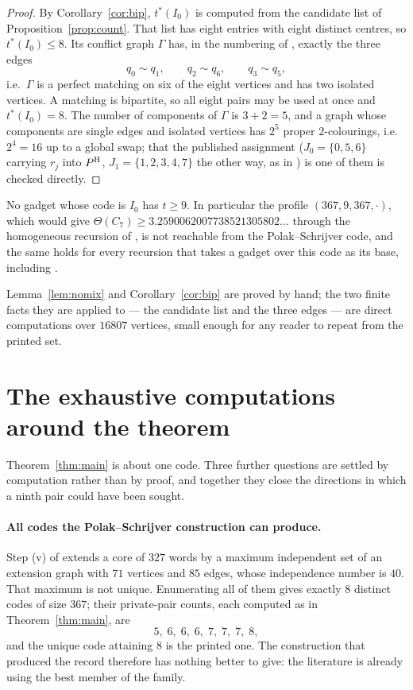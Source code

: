 \begin{proof}
By Corollary~\ref{cor:bip}, $t^*(I_0)$ is computed from the candidate list of
Proposition~\ref{prop:count}. That list has eight entries with eight distinct centres, so
$t^*(I_0)\le 8$. Its conflict graph $\Gamma$ has, in the numbering of \cite{gao2026},
exactly the three edges
\[
  q_0\sim q_1,\qquad q_2\sim q_6,\qquad q_3\sim q_5,
\]
i.e.\ $\Gamma$ is a perfect matching on six of the eight vertices and has two isolated
vertices. A matching is bipartite, so all eight pairs may be used at once and
$t^*(I_0)=8$. The number of components of $\Gamma$ is $3+2=5$, and a graph whose components
are single edges and isolated vertices has $2^5$ proper $2$-colourings, i.e.\ $2^4=16$ up to
a global swap; that the published assignment ($J_0=\{0,5,6\}$ carrying $r_j$ into $P^{\mathrm H}$,
$J_1=\{1,2,3,4,7\}$ the other way, as in \cite{gao2026}) is one of them is checked directly.
\end{proof}

\begin{corollary}
No gadget whose code is $I_0$ has $t\ge 9$. In particular the profile $(367,9,367,\cdot)$,
which would give $\Theta(C_7)\ge 3.2590062007738521305802\ldots$ through the homogeneous
recursion of \cite{gao2026,bpz2026}, is not reachable from the Polak--Schrijver code, and the
same holds for every recursion that takes a gadget over this code as its base, including
\cite{tandon2026}.
\end{corollary}

Lemma~\ref{lem:nomix} and Corollary~\ref{cor:bip} are proved by hand; the two finite facts
they are applied to --- the candidate list and the three edges --- are direct computations over
$16807$ vertices, small enough for any reader to repeat from the printed set.

\section{The exhaustive computations around the theorem}
\label{sec:exhaustive}

Theorem~\ref{thm:main} is about one code. Three further questions are settled by computation
rather than by proof, and together they close the directions in which a ninth pair could have
been sought.

\paragraph{All codes the Polak--Schrijver construction can produce.}
Step (v) of \cite{polak2019} extends a core of $327$ words by a maximum independent set of an
extension graph with $71$ vertices and $85$ edges, whose independence number is $40$. That
maximum is not unique. Enumerating all of them gives exactly $8$ distinct codes of size
$367$; their private-pair counts, each computed as in Theorem~\ref{thm:main}, are
\[
  5,\;6,\;6,\;6,\;7,\;7,\;7,\;8 ,
\]
and the unique code attaining $8$ is the printed one. The construction that produced the
record therefore has nothing better to give: the literature is already using the best member
of the family.


